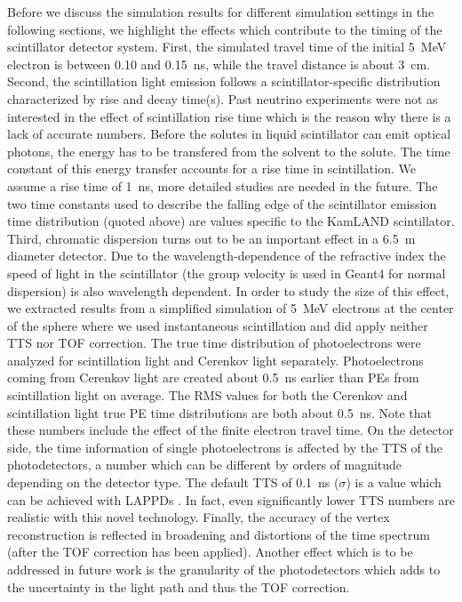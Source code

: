 \documentclass[aps,prc,twocolumn,groupedaddress,showpacs,amsmath,amssymb,floatfix,superscriptaddress]{revtex4}
\begin{document}
Before we discuss the simulation results for different simulation settings in the following sections, we highlight the effects which contribute to the timing of the scintillator detector system. First, the simulated travel time of the initial 5~MeV electron is between 0.10 and 0.15~ns, while the travel distance is about 3~cm. Second, the scintillation light emission follows a scintillator-specific distribution characterized by rise and decay time(s). Past neutrino experiments were not as interested in the effect of scintillation rise time which is the reason why there is a lack of accurate numbers. Before the solutes in liquid scintillator can emit optical photons, the energy has to be transfered from the solvent to the solute. The time constant of this energy transfer accounts for a rise time in scintillation. We assume a rise time of 1~ns, more detailed studies are needed in the future. The two time constants used to describe the falling edge of the scintillator emission time distribution (quoted above) are values specific to the KamLAND scintillator. Third, chromatic dispersion turns out to be an important effect in a 6.5~m diameter detector. Due to the wavelength-dependence of the refractive index the speed of light in the scintillator (the group velocity is used in Geant4 for normal dispersion) is also wavelength dependent. In order to study the size of this effect, we extracted results from a simplified simulation of 5~MeV electrons at the center of the sphere where we used instantaneous scintillation and did apply neither TTS nor TOF correction. The true time distribution of photoelectrons were analyzed for scintillation light and Cerenkov light separately. Photoelectrons coming from Cerenkov light are created about 0.5~ns earlier than PEs from scintillation light on average. The RMS values for both the Cerenkov and scintillation light true PE time distributions are both about 0.5~ns. Note that these numbers include the effect of the finite electron travel time. On the detector side, the time information of single photoelectrons is affected by the TTS of the photodetectors, a number which can be different by orders of magnitude depending on the detector type. The default TTS of 0.1~ns ($\sigma$) is a value which can be achieved with LAPPDs \cite{tbd}. In fact, even significantly lower TTS numbers are realistic with this novel technology. Finally, the accuracy of the vertex reconstruction is reflected in broadening and distortions of the time spectrum (after the TOF correction has been applied). Another effect which is to be addressed in future work is the granularity of the photodetectors which adds to the uncertainty in the light path and thus the TOF correction.   
\end{document}
